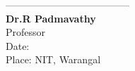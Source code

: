 \begin{titlepage}
\begin{center}
       \vspace{0.8cm}
        --------------------------------------\\ 
       \vspace{0.4cm}
        \textbf{Dr.R Padmavathy}\\
       Professor\\
       \vspace{0.8cm}
       \vspace{0.4cm}
       Date: \textunderscore\textunderscore\textunderscore\textunderscore\textunderscore\textunderscore\textunderscore\textunderscore\textunderscore \\
       \vspace{0.4cm}
       Place: NIT, Warangal
       \\
       \vspace{0.5cm}
       \date{\today}
   \end{center}
\end{titlepage}